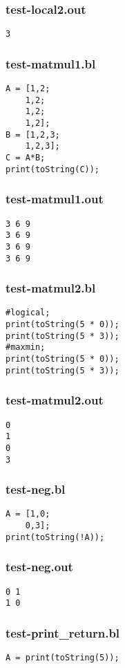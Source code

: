 \subsubsection{test-local2.out}
\begin{lstlisting}
3
\end{lstlisting}
\subsubsection{test-matmul1.bl}
\begin{lstlisting}
A = [1,2;
    1,2;
    1,2;
    1,2];
B = [1,2,3;
    1,2,3];
C = A*B;
print(toString(C));

\end{lstlisting}
\subsubsection{test-matmul1.out}
\begin{lstlisting}
3 6 9
3 6 9
3 6 9
3 6 9
\end{lstlisting}
\subsubsection{test-matmul2.bl}
\begin{lstlisting}
#logical;
print(toString(5 * 0));
print(toString(5 * 3));
#maxmin;
print(toString(5 * 0));
print(toString(5 * 3));
\end{lstlisting}
\subsubsection{test-matmul2.out}
\begin{lstlisting}
0
1
0
3
\end{lstlisting}
\subsubsection{test-neg.bl}
\begin{lstlisting}
A = [1,0;
    0,3];
print(toString(!A));
\end{lstlisting}
\subsubsection{test-neg.out}
\begin{lstlisting}
0 1
1 0
\end{lstlisting}
\subsubsection{test-print\_return.bl}
\begin{lstlisting}
A = print(toString(5));
\end{lstlisting}
